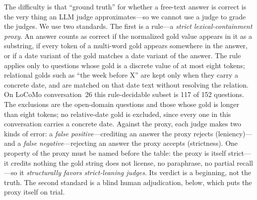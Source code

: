 \documentclass[11pt]{article}
\begin{document}
The difficulty is that ``ground truth'' for whether a free-text answer is correct is the very thing an LLM judge approximates---so we cannot use a judge to grade the judges. We use two standards. The first is a rule---a \emph{strict lexical-containment proxy}. An answer counts as correct if the normalized gold value appears in it as a substring, if every token of a multi-word gold appears somewhere in the answer, or if a date variant of the gold matches a date variant of the answer. The rule applies only to questions whose gold is a discrete value of at most eight tokens; relational golds such as ``the week before X'' are kept only when they carry a concrete date, and are matched on that date text without resolving the relation. On LoCoMo conversation~26 this rule-decidable subset is 117 of 152 questions. The exclusions are the open-domain questions and those whose gold is longer than eight tokens; no relative-date gold is excluded, since every one in this conversation carries a concrete date. Against the proxy, each judge makes two kinds of error: a \emph{false positive}---crediting an answer the proxy rejects (leniency)---and a \emph{false negative}---rejecting an answer the proxy accepts (strictness). One property of the proxy must be named before the table: the proxy is itself strict---it credits nothing the gold string does not license, no paraphrase, no partial recall---so it \emph{structurally favors strict-leaning judges}. Its verdict is a beginning, not the truth. The second standard is a blind human adjudication, below, which puts the proxy itself on trial.
\end{document}
